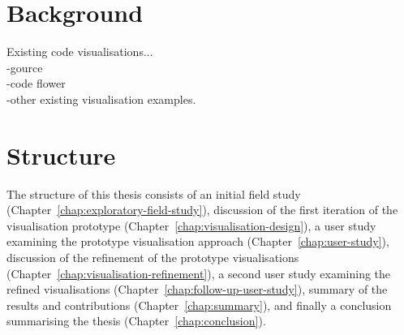 \section{Background}

Existing code visualisations...\\
-gource \cite{Caudwell2010}\\
-code flower\\
-other existing visualisation examples.\\

\section{Structure}

The structure of this thesis consists of an initial field study (Chapter~\ref{chap:exploratory-field-study}), discussion of the first iteration of the visualisation prototype (Chapter~\ref{chap:visualisation-design}), a user study examining the prototype visualisation approach (Chapter~\ref{chap:user-study}), discussion of the refinement of the prototype visualisations (Chapter~\ref{chap:visualisation-refinement}), a second user study examining the refined visualisations (Chapter~\ref{chap:follow-up-user-study}), summary of the results and contributions (Chapter~\ref{chap:summary}), and finally a conclusion summarising the thesis (Chapter~\ref{chap:conclusion}).





